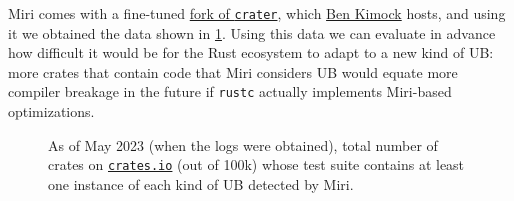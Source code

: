 \documentclass[a4paper,11pt]{article}
\theoremstyle{plain}
\theoremstyle{definition}
\theoremstyle{remark}
\begin{document}
Miri comes with a fine-tuned \href{https://github.com/saethlin/miri-tools}{fork of \texttt{crater}},
which \href{https://github.com/saethlin}{Ben Kimock} hosts, and using it we obtained the data shown in
\ref{fig:ubcount}.
Using this data we can evaluate in advance how difficult it would be for the Rust ecosystem to
adapt to a new kind of UB: more crates that contain code that Miri considers UB would equate more
compiler breakage in the future if \texttt{rustc} actually implements Miri-based optimizations.

\begin{figure}
    \caption{
        As of May 2023 (when the logs were obtained),
        total number of crates on \href{https://crates.io}{\texttt{crates.io}} (out of 100k)
        whose test suite contains at least one instance of each kind of UB detected by Miri.\\
    }
    \label{fig:ubcount}
\end{figure}
\end{document}

